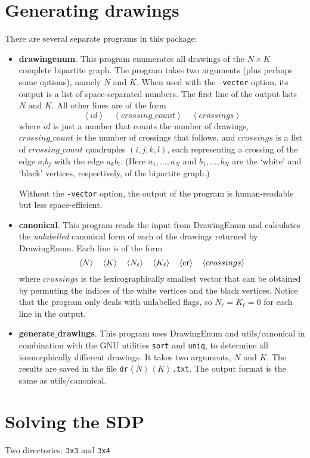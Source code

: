 \documentclass{article}
\begin{document}
\section{Generating drawings}
There are several separate programs in this package:
\begin{itemize}
\item \textbf{drawingenum}. 
This program enumerates all drawings of the $N\times K$ complete bipartite graph. The program takes two arguments (plus perhaps some options), namely $N$ and $K$.
When used with the \texttt{-vector} option, its output is a list of space-separated numbers. The first line of the output lists $N$ and $K$. All other lines are of the form
\[
\left<id\right>\quad \left<crossing\_count\right> \quad\left<crossings\right>
\]
where $id$ is just a number that counts the number of drawings, 
$crossing\_count$ is the number of crossings that follows, 
and $crossings$ is a list of $crossing\_count$ quadruples $(i, j, k, l)$, each representing a crossing of the edge $a_i b_j$ with the edge $a_k b_l$.
(Here $a_1, \hdots, a_N$ and $b_1, \hdots, b_N$ are the `white' and `black' vertices, respectively, of the bipartite graph.)

Without the \texttt{-vector} option, the output of the program 
is human-readable but less space-efficient.

\item \textbf{canonical}. This program reads the input from DrawingEnum
and calculates the \textit{unlabelled} canonical form of each of the 
drawings returned by DrawingEnum. Each line is of the form
\[
\left<N\right>
\quad\left<K\right>
\quad\left<N_\ell\right>
\quad\left<K_\ell\right>
\quad\left<\rm cr\right> 
\quad\left<crossings\right>
\]
where $crossings$ is the lexicographically smallest vector that can be
obtained by permuting the indices of the white vertices and the black vertices.
Notice that the program only deals with unlabelled flags, so $N_\ell = K_\ell = 0$ for each line in the output.

\item \textbf{generate$\_$drawings}. This program uses DrawingEnum and utils/canonical in combination with the GNU utilities \texttt{sort} and \texttt{uniq}, to determine all isomorphically different drawings. It takes two arguments, $N$ and $K$. The results are saved in the file \texttt{dr$\left<N\right>\left<K\right>$.txt}.
The output format is the same as utils/canonical.
\end{itemize}

\section{Solving the SDP}
Two directories: \texttt{3x3} and \texttt{3x4}
\end{document}
